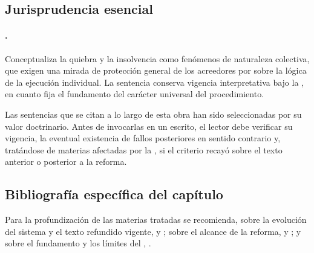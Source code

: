 \subsection{Jurisprudencia esencial}

\paragraph{ \parencite{juris-cs-15988-2013}.}
Conceptualiza la quiebra y la insolvencia como fenómenos de naturaleza colectiva, que
exigen una mirada de protección general de los acreedores por sobre la lógica de la
ejecución individual. La sentencia conserva vigencia interpretativa bajo la \LIR{}, en
cuanto fija el fundamento del carácter universal del procedimiento.

\begin{alerta}
Las sentencias que se citan a lo largo de esta obra han sido seleccionadas por su valor
doctrinario. Antes de invocarlas en un escrito, el lector debe verificar su vigencia,
la eventual existencia de fallos posteriores en sentido contrario y, tratándose de
materias afectadas por la \Lreforma{}, si el criterio recayó sobre el texto anterior o
posterior a la reforma.
\end{alerta}

\subsection{Bibliografía específica del capítulo}

Para la profundización de las materias tratadas se recomienda, sobre la evolución del
sistema y el texto refundido vigente, \textcite{aj-texto-refundido} y
\textcite{aj-ley20720-evolucion}; sobre el alcance de la reforma,
\textcite{aj-reporte-21563} y \textcite{doc-nuevos-aires}; y sobre el fundamento y los
límites del \discharge{}, \textcite{doc-discharge-modelo}.
